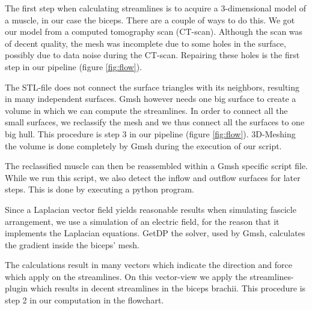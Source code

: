 \documentclass[preprint,journal]{vgtc}       %
\begin{document}
The first step when calculating streamlines is to acquire a 3-dimensional model of a muscle, in our case the biceps.
There are a couple of ways to do this.
We got our model from a computed tomography scan (CT-scan).
Although the scan was of decent quality, the mesh was incomplete due to some holes in the surface, possibly due to data noise during the CT-scan.
Repairing these holes is the first step in our pipeline (figure \ref{fig:flow}). 

The STL-file does not connect the surface triangles with its neighbors, resulting in many independent surfaces. 
Gmsh however needs one big surface to create a volume in which we can compute the streamlines. 
In order to connect all the small surfaces, we reclassify the mesh and we thus connect all the surfaces to one big hull.
This procedure is step 3 in our pipeline (figure \ref{fig:flow}). 
3D-Meshing the volume is done completely by Gmsh during the execution of our script. 

The reclassified muscle can then be reassembled within a Gmsh specific script file.
While we run this script, we also detect the inflow and outflow surfaces for later steps.
This is done by executing a python program. 
 
Since a Laplacian vector field yields reasonable results when simulating fascicle arrangement, we use a simulation of an electric field, for the reason that it implements the Laplacian equations. 
GetDP the solver, used by Gmsh, calculates the gradient inside the biceps' mesh.

The calculations result in many vectors which indicate the direction and force which apply on the  streamlines. 
On this vector-view we apply the streamlines-plugin which results in decent streamlines in the biceps brachii.
This procedure is step 2 in our computation in the flowchart.
\end{document}

